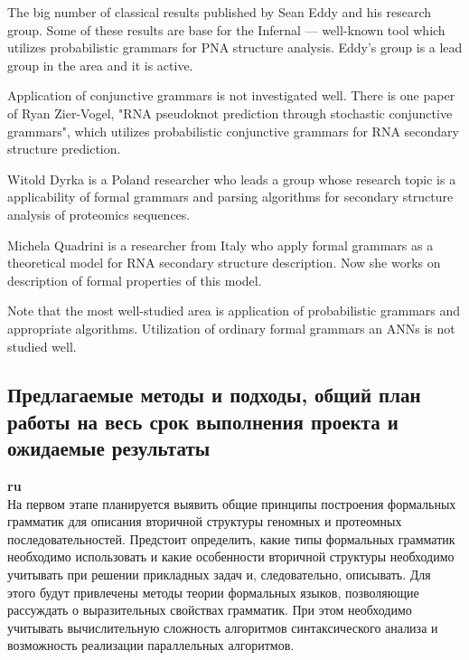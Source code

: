 \documentclass[12pt]{article}  %
\theoremstyle{remark}
\begin{document}
The big number of classical results published by Sean Eddy and his research group. Some of these results are base for the Infernal --- well-known tool which utilizes probabilistic grammars for PNA structure analysis. Eddy's group is a lead group in the area and it is active.

Application of conjunctive grammars is not investigated well. There is one paper of  Ryan Zier-Vogel, "RNA pseudoknot prediction through stochastic conjunctive grammars", which utilizes probabilistic conjunctive grammars for RNA secondary structure prediction.

 Witold Dyrka is a Poland researcher who leads a group whose research topic is a applicability of formal grammars and parsing algorithms for secondary structure analysis of proteomics sequences.

Michela Quadrini is a researcher from Italy who apply formal grammars as a theoretical model for RNA secondary structure description. Now she works on description of formal properties of this model.

Note that the most well-studied area is application of probabilistic grammars and appropriate algorithms.
Utilization of ordinary formal grammars an ANNs is not studied well.

\subsection{Предлагаемые методы и подходы, общий план работы на весь срок выполнения проекта и ожидаемые результаты }

\textbf{ru}\\
На первом этапе планируется выявить общие принципы построения формальных грамматик для описания вторичной структуры геномных и протеомных последовательностей.
Предстоит определить, какие типы формальных грамматик необходимо использовать и какие особенности вторичной структуры необходимо учитывать при решении прикладных задач и, следовательно, описывать.
Для этого будут привлечены методы теории формальных языков, позволяющие рассуждать о выразительных свойствах грамматик.
При этом необходимо учитывать вычислительную сложность алгоритмов синтаксического анализа и возможность реализации параллельных алгоритмов.
\end{document}
